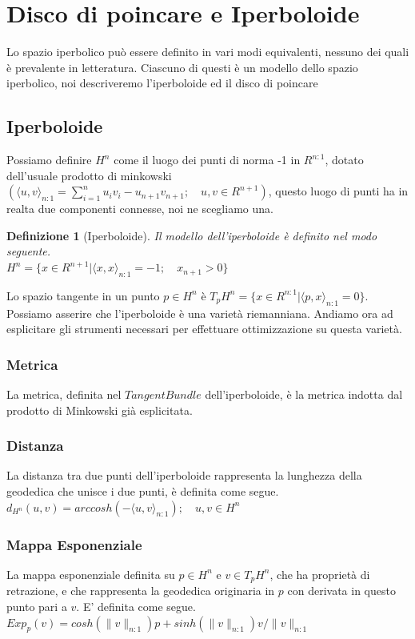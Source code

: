 \documentclass[a4paper, 12pt]{article}
\newtheorem{definition}{Definizione}
\begin{document}
\section{Disco di poincare e Iperboloide}
Lo spazio iperbolico può essere definito in vari modi equivalenti, nessuno dei quali è prevalente in letteratura. Ciascuno di questi è un modello dello spazio iperbolico, noi descriveremo l'iperboloide ed il disco di poincare
\subsection{Iperboloide}
Possiamo definire $H^n$ come il luogo dei punti di norma -1 in $R^{n:1}$, dotato dell'usuale prodotto di minkowski $(\langle u, v \rangle_{n:1} = \sum_{i=1}^{n} u_iv_i - u_{n+1}v_{n+1}; \quad u,v \in R^{n+1})$, questo luogo di punti ha in realta due componenti connesse, noi ne scegliamo una.
\begin{definition}[Iperboloide]
Il modello dell'iperboloide è definito nel modo seguente.\\
$H^n = \{x \in R^{n+1} | \langle x, x \rangle_{n:1} = -1; \quad x_{n+1} > 0 \}$
\end{definition}
Lo spazio tangente in un punto $p \in H^n$ è $T_pH^n = \{x \in R^{n:1} | \langle p,x \rangle_{n:1} = 0\}$.\\
Possiamo asserire che l'iperboloide è una varietà riemanniana. Andiamo ora ad esplicitare gli strumenti necessari per effettuare ottimizzazione su questa varietà.
\subsubsection{Metrica}
La metrica, definita nel $Tangent Bundle$ dell'iperboloide, è la metrica indotta dal prodotto di Minkowski già esplicitata.
\subsubsection{Distanza}
La distanza tra due punti dell'iperboloide rappresenta la lunghezza della geodedica che unisce i due punti, è definita come segue.\\
$d_{H^n} (u,v) = arccosh(-\langle u, v \rangle_{n:1}); \quad u,v \in H^n$
\subsubsection{Mappa Esponenziale}
La mappa esponenziale definita su $p \in H^n$ e $v \in T_pH^n$, che ha proprietà di retrazione, e che rappresenta la geodedica originaria in $p$ con derivata in questo punto pari a $v$. E' definita come segue.\\
$Exp_p(v) = cosh(\parallel v \parallel_{n:1})p + sinh(\parallel v \parallel_{n:1}) v / \parallel v \parallel_{n:1}$
\end{document}
